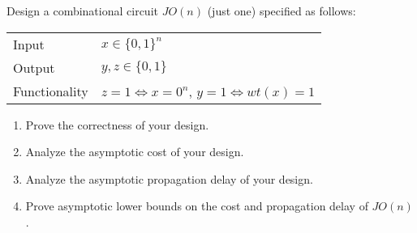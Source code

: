 \documentclass[fleqn, a4paper, 11pt, oneside]{amsart}
\theoremstyle{definition}
\theoremstyle{theorem}
\theoremstyle{remark}
\begin{document}
\begin{question}
	Design a combinational circuit $JO(n)$ (just one) specified as follows:\\
	\begin{tabular}[c]{l l}
		Input         & $x \in \{0,1\}^n$                            \\
		Output        & $y,z \in \{0,1\}$                            \\
		Functionality & $z = 1 \iff x = 0^n$, $y = 1 \iff wt(x) = 1$ \\
	\end{tabular}
	\begin{enumerate}
		\item Prove the correctness of your design.
		\item Analyze the asymptotic cost of your design.
		\item Analyze the asymptotic propagation delay of your design.
		\item Prove asymptotic lower bounds on the cost and propagation delay of $JO(n)$.
	\end{enumerate}
\end{question}
\end{document}
